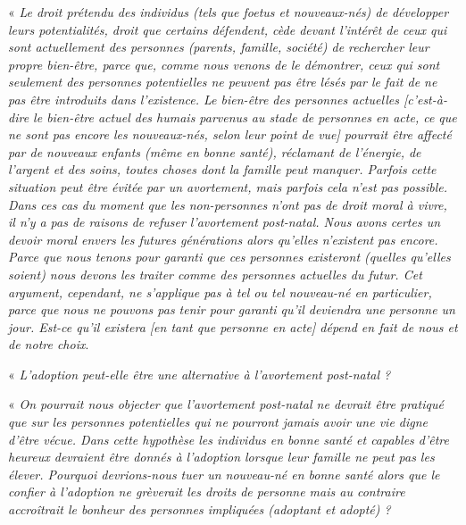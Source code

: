 « \emph{Le droit prétendu des individus (tels que foetus et nouveaux-nés) de développer leurs potentialités, droit que certains défendent, cède devant l'intérêt de ceux qui sont actuellement des personnes (parents, famille, société) de rechercher leur propre bien-être, parce que, comme nous venons de le démontrer, ceux qui sont seulement des personnes potentielles ne peuvent pas être lésés par le fait de ne pas être introduits dans l'existence. Le bien-être des personnes actuelles \emph{[c'est-à-dire le bien-être actuel des humais parvenus au stade de personnes en acte, ce que ne sont pas encore les nouveaux-nés, selon leur point de vue]} pourrait être affecté par de nouveaux enfants (même en bonne santé), réclamant de l'énergie, de l'argent et des soins, toutes choses dont la famille peut manquer. Parfois cette situation peut être évitée par un avortement, mais parfois cela n'est pas possible. Dans ces cas du moment que les non-personnes n'ont pas de droit moral à vivre, il n'y a pas de raisons de refuser l'avortement post-natal. Nous avons certes un devoir moral envers les futures générations alors qu'elles n'existent pas encore. Parce que nous tenons pour garanti que ces personnes existeront (quelles qu'elles soient) nous devons les traiter comme des personnes actuelles du futur. Cet argument, cependant, ne s'applique pas à tel ou tel nouveau-né en particulier, parce que nous ne pouvons pas tenir pour garanti qu'il deviendra une personne un jour. Est-ce qu'il existera \emph{[en tant que personne en acte]} dépend en fait de nous et de notre choix}.

« \emph{L'adoption peut-elle être une alternative à l'avortement post-natal ?}

« \emph{On pourrait nous objecter que l'avortement post-natal ne devrait être pratiqué que sur les personnes potentielles qui ne pourront jamais avoir une vie digne d'être vécue. Dans cette hypothèse les individus en bonne santé et capables d'être heureux devraient être donnés à l'adoption lorsque leur famille ne peut pas les élever. Pourquoi devrions-nous tuer un nouveau-né en bonne santé alors que le confier à l'adoption ne grèverait les droits de personne mais au contraire accroîtrait le bonheur des personnes impliquées (adoptant et adopté) ?}


